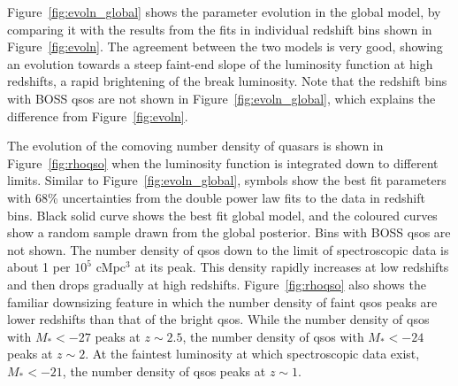 \documentclass[a4paper,fleqn,usenatbib]{mnras}
\begin{document}
Figure~\ref{fig:evoln_global} shows the parameter evolution in the
global model, by comparing it with the results from the fits in
individual redshift bins shown in Figure~\ref{fig:evoln}.  The
agreement between the two models is very good, showing an evolution
towards a steep faint-end slope of the luminosity function at high
redshifts, a rapid brightening of the break luminosity.  Note that the
redshift bins with BOSS qsos are not shown in
Figure~\ref{fig:evoln_global}, which explains the difference from
Figure~\ref{fig:evoln}.

The evolution of the comoving number density of quasars is shown in
Figure~\ref{fig:rhoqso} when the luminosity function is integrated
down to different limits.  Similar to Figure~\ref{fig:evoln_global},
symbols show the best fit parameters with 68\% uncertainties from the
double power law fits to the data in redshift bins.  Black solid curve
shows the best fit global model, and the coloured curves show a random
sample drawn from the global posterior.  Bins with BOSS qsos are not
shown.  The number density of qsos down to the limit of spectroscopic
data is about 1 per $10^5$ cMpc$^3$ at its peak.  This density rapidly
increases at low redshifts and then drops gradually at high redshifts.
Figure~\ref{fig:rhoqso} also shows the familiar downsizing feature in
which the number density of faint qsos peaks are lower redshifts than
that of the bright qsos.  While the number density of qsos with
$M_*<-27$ peaks at $z\sim 2.5$, the number density of qsos with
$M_*<-24$ peaks at $z\sim 2$.  At the faintest luminosity at which
spectroscopic data exist, $M_*<-21$, the number density of qsos peaks
at $z\sim 1$.
\end{document}
